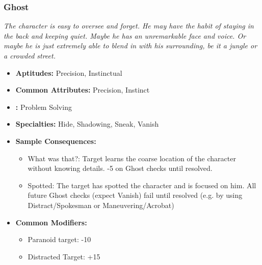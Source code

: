 	\subsubsection{Ghost}\label{Ghost}
		\textit{The character is easy to oversee and forget.
		He may have the habit of staying in the back and keeping quiet.
		Maybe he has an unremarkable face and voice.
		Or maybe he is just extremely able to blend in with his surrounding, be it a jungle or a crowded street.}
		\begin{itemize}
			\item \textbf{Aptitudes:} Precision, Instinctual
			\item \textbf{Common Attributes:} Precision, Instinct
			\item \textbf{:} Problem Solving
			\item \textbf{Specialties:} Hide, Shadowing, Sneak, Vanish
			\item \textbf{Sample Consequences:} 
			\begin{itemize}
				\item What was that?: Target learns the coarse location of the character without knowing details. -5 on Ghost checks until resolved.
				\item Spotted: The target has spotted the character and is focused on him. All future Ghost checks (expect Vanish) fail until resolved (e.g. by using Distract/Spokesman or Maneuvering/Acrobat)
			\end{itemize}
			\item \textbf{Common Modifiers:}
			\begin{itemize}
				\item Paranoid target: -10
				\item Distracted Target: +15
			\end{itemize}
		\end{itemize}

